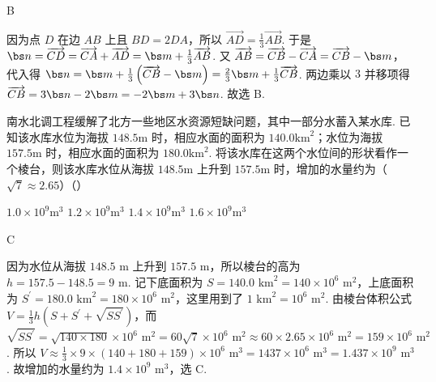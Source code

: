 \begin{answer}
B
\end{answer}

\begin{solution}

因为点 \(D\) 在边 \(AB\) 上且 \(BD=2DA\)，所以 \(\overrightarrow{AD}=\frac13\overrightarrow{AB}\). 于是 \(\bs n=\overrightarrow{CD}=\overrightarrow{CA}+\overrightarrow{AD}=\bs m+\frac13\overrightarrow{AB}\). 又 \(\overrightarrow{AB}=\overrightarrow{CB}-\overrightarrow{CA}=\overrightarrow{CB}-\bs m\)，代入得 \(\bs n=\bs m+\frac13\left(\overrightarrow{CB}-\bs m\right)=\frac23\bs m+\frac13\overrightarrow{CB}\). 两边乘以 \(3\) 并移项得 \(\overrightarrow{CB}=3\bs n-2\bs m=-2\bs m+3\bs n\). 故选 B.
\end{solution}

\begin{problem}
南水北调工程缓解了北方一些地区水资源短缺问题，其中一部分水蓄入某水库. 已知该水库水位为海拔 \(148.5\text{m}\) 时，相应水面的面积为 \(140.0\text{km}^2\)；水位为海拔 \(157.5\text{m}\) 时，相应水面的面积为 \(180.0\text{km}^2\). 将该水库在这两个水位间的形状看作一个棱台，则该水库水位从海拔 \(148.5\text{m}\) 上升到 \(157.5\text{m}\) 时，增加的水量约为（\(\sqrt7\approx 2.65\)）（\quad）

\choices
    {\(1.0\times 10^9\text{m}^3\)}
    {\(1.2\times 10^9\text{m}^3\)}
    {\(1.4\times 10^9\text{m}^3\)}
    {\(1.6\times 10^9\text{m}^3\)}
\end{problem}

\begin{answer}
C
\end{answer}

\begin{solution}
因为水位从海拔 \(148.5\text{ m}\) 上升到 \(157.5\text{ m}\)，所以棱台的高为 \(h=157.5-148.5=9\text{ m}\). 记下底面积为 \(S=140.0\text{ km}^2=140\times 10^6\text{ m}^2\)，上底面积为 \(S^{\prime}=180.0\text{ km}^2=180\times 10^6\text{ m}^2\)，这里用到了 \(1\text{ km}^2=10^6\text{ m}^2\). 由棱台体积公式 \(V=\frac13h\left(S+S^{\prime}+\sqrt{SS^{\prime}}\right)\)，而 \(\sqrt{SS^{\prime}}=\sqrt{140\times 180}\times 10^6\text{ m}^2=60\sqrt{7}\times 10^6\text{ m}^2\approx 60\times 2.65\times 10^6\text{ m}^2=159\times 10^6\text{ m}^2\). 所以 \(V\approx \frac13\times 9\times \left(140+180+159\right)\times 10^6\text{ m}^3=1437\times 10^6\text{ m}^3=1.437\times 10^9\text{ m}^3\). 故增加的水量约为 \(1.4\times 10^9\text{ m}^3\)，选 C.
\end{solution}

